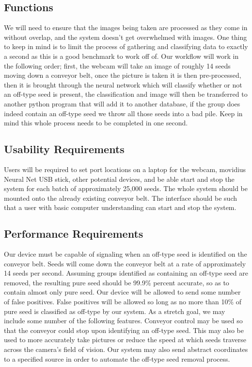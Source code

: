 \documentclass[onecolumn, draftclsnofoot,10pt, compsoc]{IEEEtran}
\begin{document}
\subsection{Functions}
We will need to ensure that the images being taken are processed as they come in without overlap, and the system doesn’t get overwhelmed with images. One thing to keep in mind is to limit the process of gathering and classifying data to exactly a second as this is a good benchmark to work off of. Our workflow will work in the following order; first, the webcam will take an image of roughly 14 seeds moving down a conveyor belt, once the picture is taken it is then pre-processed, then it is brought through the neural network which will classify whether or not an off-type seed is present, the classification and image will then be transferred to another python program that will add it to another database, if the group does indeed contain an off-type seed we throw all those seeds into a bad pile. Keep in mind this whole process needs to be completed in one second.

\subsection{Usability Requirements}
Users will be required to set port locations on a laptop for the webcam, movidius Neural Net USB stick, other potential devices, and be able start and stop the system for each batch of approximately 25,000 seeds. The whole system should be mounted onto the already existing conveyor belt. The interface should be such that a user with basic computer understanding can start and stop the system.

\subsection{Performance Requirements}
Our device must be capable of signaling when an off-type seed is identified on the conveyor belt. Seeds will come down the conveyor belt at a rate of approximately 14 seeds per second. Assuming groups identified as containing an off-type seed are removed, the resulting pure seed should be 99.9\% percent accurate, so as to contain almost only pure seed. Our device will be allowed to send some number of false positives. False positives will be allowed so long as no more than 10\% of pure seed is classified as off-type by our system. As a stretch goal, we may include some number of the following features. Conveyor control may be used so that the conveyor could stop upon identifying an off-type seed. This may also be used to more accurately take pictures or reduce the speed at which seeds traverse across the camera's field of vision. Our system may also send abstract coordinates to a specified source in order to automate the off-type seed removal process.
\end{document}
